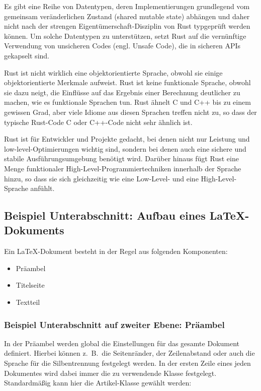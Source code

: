 Es gibt eine Reihe von Datentypen, deren Implementierungen grundlegend vom gemeinsam veränderlichen Zustand (shared mutable state) abhängen und daher nicht nach der strengen Eigentümerschaft-Disziplin von Rust typgeprüft werden können. Um solche Datentypen zu unterstützen, setzt Rust auf die vernünftige Verwendung von unsicheren Codes (engl. Unsafe Code), die in sicheren APIs gekapselt sind.





Rust ist nicht wirklich eine objektorientierte Sprache, obwohl sie einige objektorientierte Merkmale aufweist. Rust ist keine funktionale Sprache, obwohl sie dazu neigt, die Einflüsse auf das Ergebnis einer Berechnung deutlicher zu machen, wie es funktionale Sprachen tun. Rust ähnelt C und C++ bis zu einem gewissen Grad, aber viele Idiome aus diesen Sprachen treffen nicht zu, so dass der typische Rust-Code C oder C++-Code nicht sehr ähnlich ist.

Rust ist für Entwickler und Projekte gedacht, bei denen nicht nur Leistung und low-level-Optimierungen wichtig sind, sondern bei denen auch eine sichere und stabile Ausführungsumgebung benötigt wird. Darüber hinaus fügt Rust eine Menge funktionaler High-Level-Programmiertechniken innerhalb der Sprache hinzu, so dass sie sich gleichzeitig wie eine Low-Level- und eine High-Level-Sprache anfühlt.


\subsection{Beispiel Unterabschnitt: Aufbau eines \LaTeX-Dokuments}

Ein \LaTeX-Dokument besteht in der Regel aus folgenden Komponenten:
\begin{itemize}
	\item Pr\"aambel
	\item Titelseite
	\item Textteil
\end{itemize}

\subsubsection{Beispiel Unterabschnitt auf zweiter Ebene: Pr\"aambel}
In der Pr\"aambel werden global die Einstellungen f\"ur das gesamte Dokument definiert. Hierbei k\"onnen z.~B.~die Seitenr\"ander, 
der Zeilenabstand oder auch die Sprache f\"ur die Silbentrennung festgelegt werden. In der ersten Zeile eines jeden Dokumentes wird dabei
immer die zu verwendende Klasse festgelegt. Standardm\"aßig kann hier die Artikel-Klasse gew\"ahlt werden:

